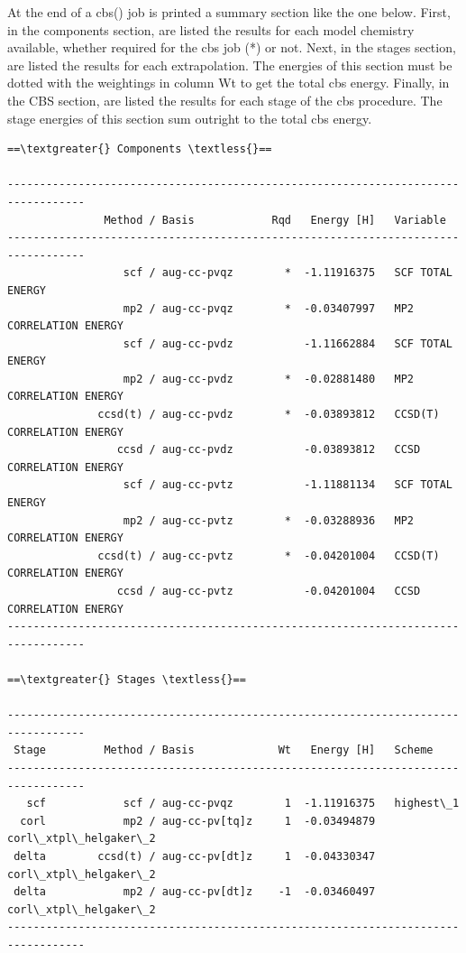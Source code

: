 \documentclass[letterpaper,10pt,english]{sphinxmanual}
\begin{document}
At the end of a cbs() job is printed a summary section like the one below. First,
in the components section, are listed the results for each model chemistry available, whether
required for the cbs job (*) or not. Next, in the stages section, are listed the results for
each extrapolation. The energies of this section must be dotted with the weightings in column Wt
to get the total cbs energy. Finally, in the CBS section, are listed the results for each stage
of the cbs procedure. The stage energies of this section sum outright to the total cbs energy.

\begin{Verbatim}[commandchars=\\\{\}]
==\textgreater{} Components \textless{}==

----------------------------------------------------------------------------------
               Method / Basis            Rqd   Energy [H]   Variable
----------------------------------------------------------------------------------
                  scf / aug-cc-pvqz        *  -1.11916375   SCF TOTAL ENERGY
                  mp2 / aug-cc-pvqz        *  -0.03407997   MP2 CORRELATION ENERGY
                  scf / aug-cc-pvdz           -1.11662884   SCF TOTAL ENERGY
                  mp2 / aug-cc-pvdz        *  -0.02881480   MP2 CORRELATION ENERGY
              ccsd(t) / aug-cc-pvdz        *  -0.03893812   CCSD(T) CORRELATION ENERGY
                 ccsd / aug-cc-pvdz           -0.03893812   CCSD CORRELATION ENERGY
                  scf / aug-cc-pvtz           -1.11881134   SCF TOTAL ENERGY
                  mp2 / aug-cc-pvtz        *  -0.03288936   MP2 CORRELATION ENERGY
              ccsd(t) / aug-cc-pvtz        *  -0.04201004   CCSD(T) CORRELATION ENERGY
                 ccsd / aug-cc-pvtz           -0.04201004   CCSD CORRELATION ENERGY
----------------------------------------------------------------------------------

==\textgreater{} Stages \textless{}==

----------------------------------------------------------------------------------
 Stage         Method / Basis             Wt   Energy [H]   Scheme
----------------------------------------------------------------------------------
   scf            scf / aug-cc-pvqz        1  -1.11916375   highest\_1
  corl            mp2 / aug-cc-pv[tq]z     1  -0.03494879   corl\_xtpl\_helgaker\_2
 delta        ccsd(t) / aug-cc-pv[dt]z     1  -0.04330347   corl\_xtpl\_helgaker\_2
 delta            mp2 / aug-cc-pv[dt]z    -1  -0.03460497   corl\_xtpl\_helgaker\_2
----------------------------------------------------------------------------------


\end{Verbatim}
\end{document}
